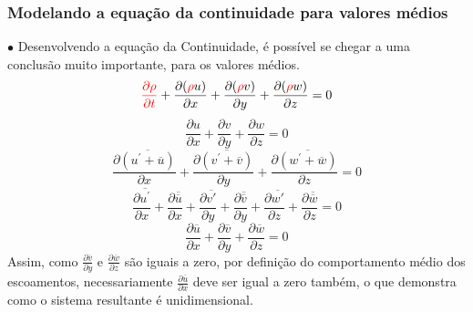\documentclass[xcolor=dvipsnames,10pt,aspectratio=169]{beamer}
\begin{document}
		
		
		
		
		\begin{frame}
			\frametitle{Modelando a equação da continuidade para valores médios}
			$\bullet$ Desenvolvendo a equação da Continuidade, é possível se chegar a uma conclusão muito importante, para os valores médios.
			\begin{equation*}
			\color{red}\frac{\partial \rho}{\partial t} \color{black}+  \frac{\partial (\color{red}\rho \color{black}u)}{\partial x} + \frac{\partial (\color{red} \rho \color{black}v)}{\partial y} + \frac{\partial (\color{red}\rho \color{black}w)}{\partial z} = 0
			\end{equation*}
			\begin{equation}
			\frac{\partial u}{\partial x} + \frac{\partial v}{\partial y} + \frac{\partial w}{\partial z} = 0
			\end{equation}
			\begin{equation}
			\frac{\partial \overline{(u^\prime + \overline{u})}}{\partial x} + \frac{\partial \overline{(v^\prime + \overline{v})}}{\partial y} + \frac{\partial \overline{(w^\prime + \overline{w})}}{\partial z} = 0
			\end{equation}
			\begin{equation}
			\frac{\partial \overline{u^\prime}}{\partial x} +\frac{\partial \overline{\overline{u}}}{\partial x} + \frac{\partial \overline{v\prime}}{\partial y} +\frac{\partial \overline{\overline{v}}}{\partial y} + \frac{\partial \overline{w\prime}}{\partial z} +\frac{\partial \overline{\overline{w}}}{\partial z} = 0
			\end{equation}
			\begin{equation}
			\frac{\partial {\overline{u}}}{\partial x} +\frac{\partial {\overline{v}}}{\partial y} +\frac{\partial {\overline{w}}}{\partial z} = 0
			\end{equation}
			Assim, como $ \frac{\partial {\overline{v}}}{\partial y} $ e $ \frac{\partial {\overline{w}}}{\partial z}$ são iguais a zero, por definição do comportamento médio dos escoamentos, necessariamente $\frac{\partial {\overline{u}}}{\partial x}$ deve ser igual a zero também, o que demonstra como o sistema resultante é unidimensional.
		\end{frame}
		
		
		
\end{document}
